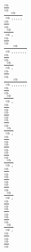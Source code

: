 \documentclass[11pt]{article}
\begin{document}
\begin{center}
\bigskip
\\$\frac{\Rightarrow }{\Rightarrow }$
\bigskip
\\$\frac{\Rightarrow }{\Rightarrow , , , , , }$
\bigskip
\\$\frac{\Rightarrow }{\Rightarrow }$
\bigskip
\\$\frac{\Rightarrow }{\Rightarrow , }$
\bigskip
\\$\frac{\Rightarrow }{\Rightarrow }$
\bigskip
\\$\frac{\Rightarrow }{\Rightarrow , , , , , , , }$
\bigskip
\\$\frac{\Rightarrow }{\Rightarrow }$
\bigskip
\\$\frac{\Rightarrow }{\Rightarrow , }$
\bigskip
\\$\frac{\Rightarrow }{\Rightarrow }$
\bigskip
\\$\frac{\Rightarrow }{\Rightarrow , , , , , , , }$
\bigskip
\\$\frac{\Rightarrow }{\Rightarrow }$
\bigskip
\\$\frac{\Rightarrow }{\Rightarrow , }$
\bigskip
\\$\frac{\Rightarrow }{\Rightarrow }$
\bigskip
\\$\frac{\Rightarrow }{\Rightarrow }$
\bigskip
\\$\frac{\Rightarrow }{\Rightarrow }$
\bigskip
\\$\frac{\Rightarrow }{\Rightarrow , }$
\bigskip
\\$\frac{\Rightarrow }{\Rightarrow }$
\bigskip
\\$\frac{\Rightarrow }{\Rightarrow }$
\bigskip
\\$\frac{\Rightarrow }{\Rightarrow }$
\bigskip
\\$\frac{\Rightarrow }{\Rightarrow , }$
\bigskip
\\$\frac{\Rightarrow }{\Rightarrow }$
\bigskip
\\$\frac{\Rightarrow }{\Rightarrow }$
\bigskip
\\$\frac{\Rightarrow }{\Rightarrow }$
\bigskip
\\$\frac{\Rightarrow }{\Rightarrow , }$
\bigskip
\\$\frac{\Rightarrow }{\Rightarrow }$
\bigskip
\\$\frac{\Rightarrow }{\Rightarrow }$
\bigskip
\\$\frac{\Rightarrow }{\Rightarrow }$
\bigskip
\\$\frac{\Rightarrow }{\Rightarrow , }$
\bigskip
\\$\frac{\Rightarrow }{\Rightarrow }$
\bigskip
\\$\frac{\Rightarrow }{\Rightarrow }$

\end{center}
\end{document}

